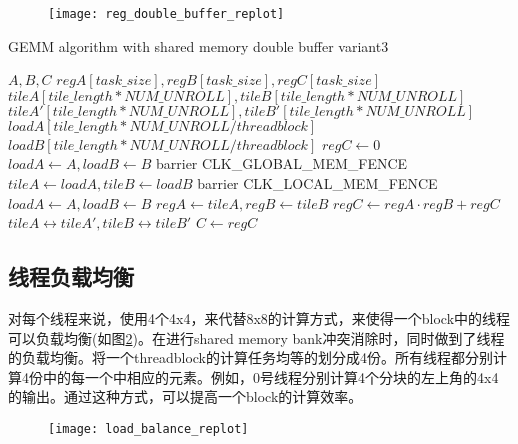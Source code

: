 \begin{figure}[htbp]
	\centering
	\texttt{[image: reg\_double\_buffer\_replot]}
	\label{fig:reg_double_buffer_replot}
\end{figure}

\begin{algorithm}[htbp]
	\small
	\caption{GEMM algorithm with shared memory double buffer variant3}\label{alg:gemm_sharedmem_v3}
	\begin{algorithmic}[1]
		\State $A, B, C$
		\State $regA[task\_size],regB[task\_size],regC[task\_size]$
		\State $tileA[tile\_length*NUM\_UNROLL],tileB[tile\_length*NUM\_UNROLL]$
		\State $tileA'[tile\_length*NUM\_UNROLL],tileB'[tile\_length*NUM\_UNROLL]$
		\State $loadA[tile\_length*NUM\_UNROLL/threadblock]$
		\State $loadB[tile\_length*NUM\_UNROLL/threadblock]$
		\State $regC \gets 0$
		\State $loadA \gets A, loadB \gets B $
				\State barrier CLK\_GLOBAL\_MEM\_FENCE
				\State $tileA \gets loadA, tileB \gets loadB$
				\State barrier CLK\_LOCAL\_MEM\_FENCE
				\State $loadA \gets A, loadB \gets B $
						\State $regA \gets tileA, regB \gets tileB$
						\State $regC \gets regA \cdot regB + regC$
					\EndFor
				\State $tileA \leftrightarrow tileA', tileB \leftrightarrow tileB'$
			\EndFor\label{gemmendfor}
		\State $C \gets regC$
	\end{algorithmic}
\end{algorithm}

\subsection{线程负载均衡}
对每个线程来说，使用4个4x4，来代替8x8的计算方式，来使得一个block中的线程可以负载均衡(如图\ref{fig:load_balance_replot})。在进行shared memory bank冲突消除时，同时做到了线程的负载均衡。将一个threadblock的计算任务均等的划分成4份。所有线程都分别计算4份中的每一个中相应的元素。例如，0号线程分别计算4个分块的左上角的4x4的输出。通过这种方式，可以提高一个block的计算效率。
\begin{figure}[htbp]
	\centering
	\texttt{[image: load\_balance\_replot]}
	\label{fig:load_balance_replot}
\end{figure}



